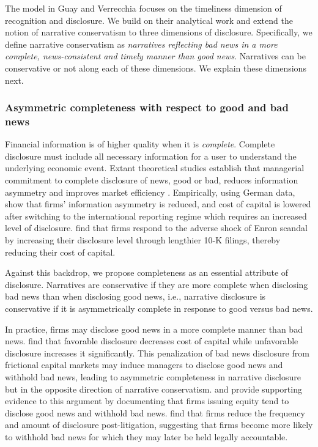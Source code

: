 \documentclass[letterpaper,12pt]{article}
\begin{document}
\begin{spacing}{1.5}
The model in Guay and Verrecchia \citeyear{guayConservativeDisclosure2018} focuses on the timeliness dimension of recognition and disclosure. We build on their analytical work and extend the notion of narrative conservatism to three dimensions of disclosure. Specifically, we define narrative conservatism as \textit{narratives reflecting bad news in a more complete, news-consistent and timely manner than good news}. Narratives can be conservative or not along each of these dimensions. We explain these dimensions next.

\subsubsection{Asymmetric completeness with respect to good and bad news}

\noindent Financial information is of higher quality when it is \textit{complete}. Complete disclosure must include all necessary information for a user to understand the underlying economic event. Extant theoretical studies establish that managerial commitment to complete disclosure of news, good or bad, reduces information asymmetry and improves market efficiency \cite{glostenBidAskTransaction1985, diamondOptimalReleaseInformation1985, diamondDisclosureLiquidityCost1991, baimanRelationCapitalMarkets1996}. Empirically, using German data,  show that firms' information asymmetry is reduced, and cost of capital is lowered after switching to the international reporting regime which requires an increased level of disclosure.  find that firms respond to the adverse shock of Enron scandal by increasing their disclosure level through lengthier 10-K filings, thereby reducing their cost of capital. 

Against this backdrop, we propose completeness as an essential attribute of disclosure. Narratives are conservative if they are more complete when disclosing bad news than when disclosing good news, i.e., narrative disclosure is conservative if it is asymmetrically complete in response to good versus bad news. 

In practice, firms may disclose good news in a more complete manner than bad news.  find that favorable disclosure decreases cost of capital while unfavorable disclosure increases it significantly. This penalization of bad news disclosure from frictional capital markets may induce managers to disclose good news and withhold bad news, leading to asymmetric completeness in narrative disclosure but in the opposite direction of narrative conservatism.  and  provide supporting evidence to this argument by documenting that firms issuing equity tend to disclose good news and withhold bad news.  find that firms reduce the frequency and amount of disclosure post-litigation, suggesting that firms become more likely to withhold bad news for which they may later be held legally accountable. 


\end{spacing}
\end{document}
